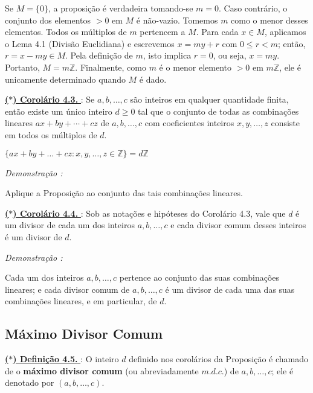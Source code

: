 Se $M = \{0\}$, a proposição é verdadeira tomando-se $m = 0$. Caso contrário, o conjunto dos elementos
$> 0$ em $M$ é não-vazio. Tomemos $m$ como o menor desses elementos. Todos os múltiplos de $m$ pertencem
a $M$. Para cada $x \in M$, aplicamos o Lema 4.1 (Divisão Euclidiana) e escrevemos $x = my + r$ com
$0 \le r < m$; então, $r = x - my \in M$. Pela definição de $m$, isto implica $r = 0$, ou seja, $x = my$. Portanto,
$M = m\mathbb{Z}$. Finalmente, como $m$ é o menor elemento $> 0$ em $m\mathbb{Z}$, ele é unicamente determinado quando
$M$ é dado.

\vspace{0.2cm}
\noindent\underline{\underline{\textbf{($\ast$) Corolário 4.3. }}} : Se $a, b, \ldots, c$ são inteiros em qualquer quantidade finita, 
então existe um único inteiro $d \ge 0$ tal que o conjunto de todas as combinações lineares $ax + by + \cdots + cz$ de 
$a, b, \ldots, c$ com coeficientes inteiros $x, y, \ldots, z$ consiste em todos os múltiplos de $d$.

\begin{center}
    $ \{ax + by + \ldots + cz : x,y,\ldots,z \in \mathbb{Z} \} = d\mathbb{Z} $
\end{center}

\vspace{0.2cm}
\noindent\textit{Demonstração : }

Aplique a Proposição ao conjunto das tais combinações lineares.

\vspace{0.2cm}
\noindent\underline{\underline{\textbf{($\ast$) Corolário 4.4. }}} : Sob as notações e hipóteses do Corolário 4.3, vale que $d$ é um 
divisor de cada um dos inteiros $a, b, \ldots, c$ e cada divisor comum desses inteiros é um divisor de $d$.

\vspace{0.2cm}
\noindent\textit{Demonstração : }

Cada um dos inteiros $a, b, \ldots, c$ pertence ao conjunto das suas combinações lineares; e cada divisor comum de 
$a, b, \ldots, c$ é um divisor de cada uma das suas combinações lineares, e em particular, de $d$.

\subsection*{Máximo Divisor Comum}

\noindent\underline{\underline{\textbf{($\ast$) Definição 4.5. }}} : O inteiro $d$ definido nos corolários da Proposição é chamado 
de o \textbf{máximo divisor comum} (ou abreviadamente \textbf{$m.d.c.$}) de $a, b, \ldots, c$; ele é denotado por $(a, b, \ldots, c)$.  

